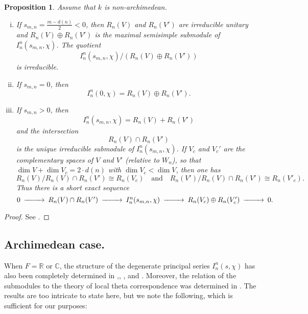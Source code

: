 \documentclass[10pt]{amsart}
\theoremstyle{plain}
\newtheorem{Prop}[equation]{Proposition}
\numberwithin{equation}{section}
\begin{document}
 \begin{Prop} \label{P:str}
 Assume that $k$ is non-archimedean. 
 \vskip 5pt
 \begin{enumerate}[(i)]
 \item If $s_{m,n} = \frac{m - d(n)}{2}  <  0$, then $R_n(V)$ and
   $R_n(V')$ are irreducible unitary and $R_n(V) \oplus R_n(V')$ is
   the maximal semisimple submodule of  $I^n_n(s_{m,n}, \chi)$. The
   quotient
 \[ I^n_n(s_{m,n}, \chi)/  (R_n(V) \oplus R_n(V')) \]
is irreducible.
\item If $s_{m,n} = 0$, then
\[  I^n_n(0, \chi)  =  R_n(V) \oplus R_n(V') . \]
\item If $s_{m,n} >0$, then
\[  I^n_n(s_{m,n}, \chi)  =  R_n(V) +  R_n(V') \]
  and the intersection
  \[  R_n(V) \cap R_n(V') \]
  is  the unique irreducible submodule of $I^n_n(s_{m,n},\chi)$. If
  $V_c$ and $V_c'$ are the complementary spaces of $V$ and $V'$
  (relative to $W_n$), so that 
 $\dim V + \dim V_c = 2 \cdot d(n)$ with $\dim V_c < \dim V$, then one has
 \[  R_n(V)/R_n(V) \cap R_n(V') \cong R_n(V_c) \quad \text{and} \quad
 R_n(V')/R_n(V) \cap R_n(V')  \cong R_n(V'_c). \]
 Thus there is a short exact sequence
  \[  \begin{CD}
 0 @>>>  R_n(V) \cap R_n(V') @>>> I^n_n(s_{m,n}, \chi) @>>> R_n(V_c)
 \oplus R_n(V'_c) @>>> 0. \end{CD} \]
\end{enumerate}
 \end{Prop} 
 \begin{proof}
See \cite{KR4, KS, S2, Y1}.
\end{proof}
 
 \vskip 5pt
 
\subsection{\bf Archimedean case.}
When $F = {\mathbb{R}}$ or ${\mathbb C}$, the structure of the degenerate principal
series  $I^n_n(s, \chi)$ has also been completely determined in
\cite{L1, L2},\cite{HL}, \cite[Appendix A]{Lo}, and \cite{LZ3,
  LZ4}. Moreover, the relation of the submodules to the theory of
local theta correspondence was determined in
\cite{LZ1,LZ2,LZ3,LZ4}. The results are too intricate to state here,
but we note the following, which is sufficient for our purposes:
\vskip 5pt
\end{document}
